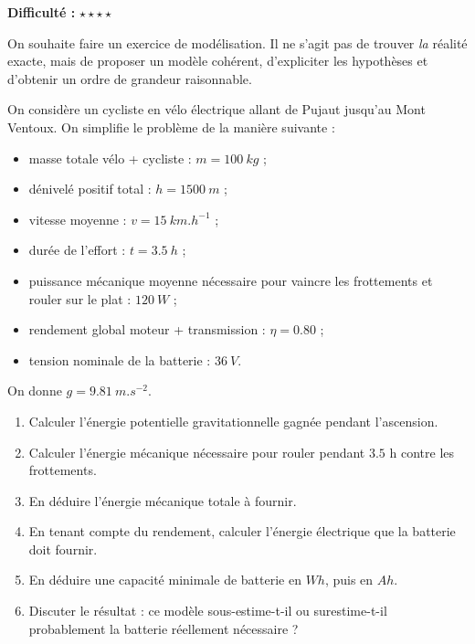\documentclass[11pt,a4paper]{article}
\newcommand{\etoiles}[1]{\textbf{Difficulté :} #1}
\begin{document}
\begin{exercisebox}
\etoiles{\(\star\star\star\star\)}

On souhaite faire un exercice de modélisation. Il ne s'agit pas de trouver \emph{la} réalité exacte, mais de proposer un modèle cohérent, d'expliciter les hypothèses et d'obtenir un ordre de grandeur raisonnable.

On considère un cycliste en vélo électrique allant de Pujaut jusqu'au Mont Ventoux. On simplifie le problème de la manière suivante :

\begin{itemize}
    \item masse totale vélo + cycliste : \(m=\SI{100}{kg}\) ;
    \item dénivelé positif total : \(h=\SI{1500}{m}\) ;
    \item vitesse moyenne : \(v=\SI{15}{km.h^{-1}}\) ;
    \item durée de l'effort : \(t=\SI{3.5}{h}\) ;
    \item puissance mécanique moyenne nécessaire pour vaincre les frottements et rouler sur le plat : \(\SI{120}{W}\) ;
    \item rendement global moteur + transmission : \(\eta=0.80\) ;
    \item tension nominale de la batterie : \(\SI{36}{V}\).
\end{itemize}

On donne \(g=\SI{9.81}{m.s^{-2}}\).

\begin{enumerate}[label=\alph*)]
    \item Calculer l'énergie potentielle gravitationnelle gagnée pendant l'ascension.
    \item Calculer l'énergie mécanique nécessaire pour rouler pendant \(3.5\) h contre les frottements.
    \item En déduire l'énergie mécanique totale à fournir.
    \item En tenant compte du rendement, calculer l'énergie électrique que la batterie doit fournir.
    \item En déduire une capacité minimale de batterie en \(\si{Wh}\), puis en \(\si{Ah}\).
    \item Discuter le résultat : ce modèle sous-estime-t-il ou surestime-t-il probablement la batterie réellement nécessaire ?
\end{enumerate}
\end{exercisebox}
\end{document}
